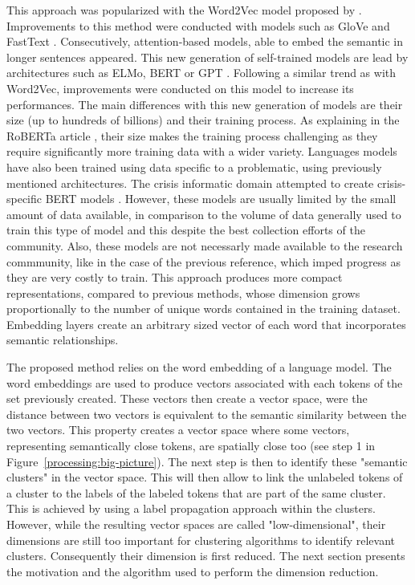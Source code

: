 This approach was popularized with the Word2Vec model proposed by \textcite{mikolovDistributedRepresentationsWords2013}.
Improvements to this method were conducted with models such as GloVe and FastText \parencite{bojanowskiEnrichingWordVectors2016,penningtonGloveGlobalVectors2014}.
Consecutively, attention-based models, able to embed the semantic in longer sentences appeared.
This new generation of self-trained models are lead by architectures such as ELMo, BERT or GPT \parencite{devlinBERTPretrainingDeep2018,petersDeepContextualizedWord2018}.
Following a similar trend as with Word2Vec, improvements were conducted on this model to increase its performances.
The main differences with this new generation of models are their size (up to hundreds of billions) and their training process.
As explaining in the RoBERTa article \parencite{liuRoBERTaRobustlyOptimized2019}, their
size makes the training process challenging as they require significantly more training
data with a wider variety.
Languages models have also been trained using data specific to a problematic, using previously
mentioned architectures.
The crisis informatic domain attempted to create crisis-specific BERT models \parencite{liuCrisisBERTRobustTransformer2021}.
However, these models are usually limited by the small amount of data available, in comparison
to the volume of data generally used to train this type of model and this despite the best
collection efforts of the community.
Also, these models are not necessarly made available to the research commmunity, like in
the case of the previous reference, which imped progress as they are very costly to train.
This approach produces more compact representations, compared to previous methods, whose
dimension grows proportionally to the number of unique words contained in the training dataset.
Embedding layers create an arbitrary sized vector of each word that incorporates semantic
relationships.

The proposed method relies on the word embedding of a language model.
The word embeddings are used to produce vectors associated with each tokens of the set
previously created.
These vectors then create a vector space, were the distance between two vectors is
equivalent to the semantic similarity between the two vectors.
This property creates a vector space where some vectors, representing semantically close
tokens, are spatially close too (see step 1 in Figure~\ref{processing:big-picture}).
The next step is then to identify these "semantic clusters" in the vector space.
This will then allow to link the unlabeled tokens of a cluster to the labels of the
labeled tokens that are part of the same cluster.
This is achieved by using a label propagation approach within the clusters.
However, while the resulting vector spaces are called "low-dimensional", their dimensions
are still too important for clustering algorithms to identify relevant clusters.
Consequently their dimension is first reduced.
The next section presents the motivation and the algorithm used to perform the dimension reduction.

